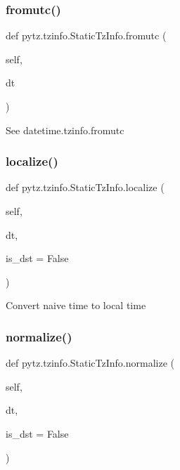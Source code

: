\subsubsection{\texorpdfstring{fromutc()}{fromutc()}}
{\footnotesize\ttfamily def pytz.\+tzinfo.\+Static\+Tz\+Info.\+fromutc (\begin{DoxyParamCaption}\item[{}]{self,  }\item[{}]{dt }\end{DoxyParamCaption})}

\begin{DoxyVerb}See datetime.tzinfo.fromutc\end{DoxyVerb}
 \mbox{\label{classpytz_1_1tzinfo_1_1StaticTzInfo_a496aa3c68f9a79d26d62826923489fb8}} 
\subsubsection{\texorpdfstring{localize()}{localize()}}
{\footnotesize\ttfamily def pytz.\+tzinfo.\+Static\+Tz\+Info.\+localize (\begin{DoxyParamCaption}\item[{}]{self,  }\item[{}]{dt,  }\item[{}]{is\+\_\+dst = {\ttfamily False} }\end{DoxyParamCaption})}

\begin{DoxyVerb}Convert naive time to local time\end{DoxyVerb}
 \mbox{\label{classpytz_1_1tzinfo_1_1StaticTzInfo_ab212a5ffb525fe66527c014149a86f33}} 
\subsubsection{\texorpdfstring{normalize()}{normalize()}}
{\footnotesize\ttfamily def pytz.\+tzinfo.\+Static\+Tz\+Info.\+normalize (\begin{DoxyParamCaption}\item[{}]{self,  }\item[{}]{dt,  }\item[{}]{is\+\_\+dst = {\ttfamily False} }\end{DoxyParamCaption})}


